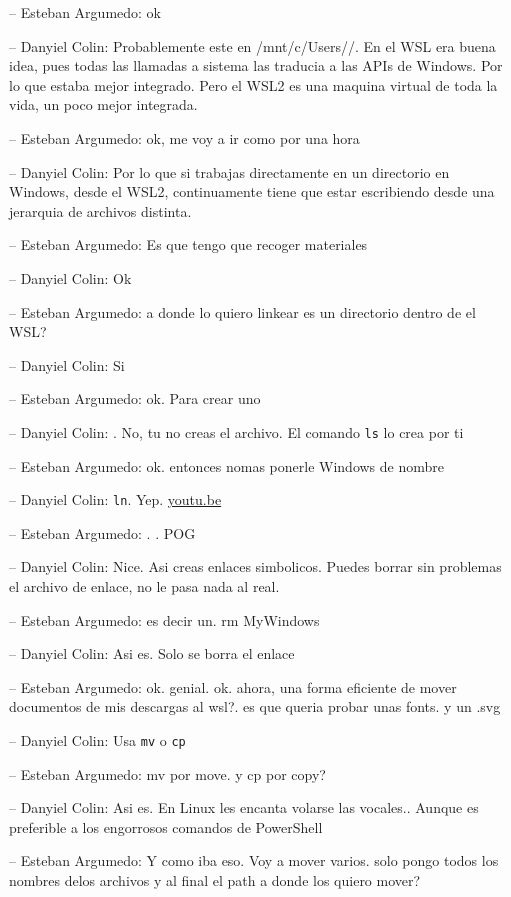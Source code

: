 -- Esteban Argumedo: ok

-- Danyiel Colin: Probablemente este en /mnt/c/Users//. En el WSL era
buena idea, pues todas las llamadas a sistema las traducia a las APIs de
Windows. Por lo que estaba mejor integrado. Pero el WSL2 es una maquina
virtual de toda la vida, un poco mejor integrada.

-- Esteban Argumedo: ok, me voy a ir como por una hora

-- Danyiel Colin: Por lo que si trabajas directamente en un directorio
en Windows, desde el WSL2, continuamente tiene que estar escribiendo
desde una jerarquia de archivos distinta.

-- Esteban Argumedo: Es que tengo que recoger materiales

-- Danyiel Colin: Ok

-- Esteban Argumedo: a donde lo quiero linkear es un directorio dentro
de el WSL?

-- Danyiel Colin: Si

-- Esteban Argumedo: ok. Para crear uno

-- Danyiel Colin: . No, tu no creas el archivo. El comando \texttt{ls}
lo crea por ti

-- Esteban Argumedo: ok. entonces nomas ponerle Windows de nombre

-- Danyiel Colin: \texttt{ln}. Yep.
\href{https://youtu.be/TgHtp16pXfg}{youtu.be}

-- Esteban Argumedo: . . POG

-- Danyiel Colin: Nice. Asi creas enlaces simbolicos. Puedes borrar sin
problemas el archivo de enlace, no le pasa nada al real.

-- Esteban Argumedo: es decir un. rm MyWindows

-- Danyiel Colin: Asi es. Solo se borra el enlace

-- Esteban Argumedo: ok. genial. ok. ahora, una forma eficiente de mover
documentos de mis descargas al wsl?. es que queria probar unas fonts. y
un .svg

-- Danyiel Colin: Usa \texttt{mv} o \texttt{cp}

-- Esteban Argumedo: mv por move. y cp por copy?

-- Danyiel Colin: Asi es. En Linux les encanta volarse las vocales..
Aunque es preferible a los engorrosos comandos de PowerShell

-- Esteban Argumedo: Y como iba eso. Voy a mover varios. solo pongo
todos los nombres delos archivos y al final el path a donde los quiero
mover?

